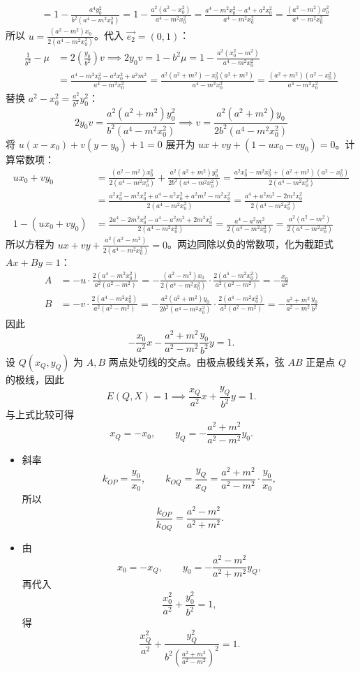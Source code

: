 \begin{solution}
\begin{align*}
&=1 - \frac{a^4 y_0^2}{b^2(a^4-m^2 x_0^2)} = 1 - \frac{a^2(a^2-x_0^2)}{a^4-m^2 x_0^2} = \frac{a^4-m^2 x_0^2 - a^4 + a^2 x_0^2}{a^4-m^2 x_0^2} = \frac{(a^2-m^2)x_0^2}{a^4-m^2 x_0^2}
\end{align*}
所以 $u = \frac{(a^2-m^2)x_0}{2(a^4-m^2 x_0^2)}$。代入 $\vec{e_2} = (0,1)$：
\begin{align*}
\frac{1}{b^2} - \mu &= 2\left(\frac{y_0}{b^2}\right)v \implies 2y_0 v = 1 - b^2 \mu = 1 - \frac{a^2(x_0^2-m^2)}{a^4-m^2 x_0^2}\\
&= \frac{a^4-m^2 x_0^2 - a^2 x_0^2 + a^2 m^2}{a^4-m^2 x_0^2} = \frac{a^2(a^2+m^2) - x_0^2(a^2+m^2)}{a^4-m^2 x_0^2} = \frac{(a^2+m^2)(a^2-x_0^2)}{a^4-m^2 x_0^2}
\end{align*}
替换 $a^2-x_0^2 = \frac{a^2}{b^2}y_0^2$：$$2y_0 v = \frac{a^2(a^2+m^2)y_0^2}{b^2(a^4-m^2 x_0^2)} \implies v = \frac{a^2(a^2+m^2)y_0}{2b^2(a^4-m^2 x_0^2)}$$
将 $u(x-x_0) + v(y-y_0) + 1 = 0$ 展开为 $ux + vy + (1 - ux_0 - vy_0) = 0$。计算常数项：
\begin{align*}
u x_0 + v y_0 &= \frac{(a^2-m^2)x_0^2}{2(a^4-m^2 x_0^2)} + \frac{a^2(a^2+m^2)y_0^2}{2b^2(a^4-m^2 x_0^2)} = \frac{a^2 x_0^2 - m^2 x_0^2 + (a^2+m^2)(a^2-x_0^2)}{2(a^4-m^2 x_0^2)}\\
&= \frac{a^2 x_0^2 - m^2 x_0^2 + a^4 - a^2 x_0^2 + a^2 m^2 - m^2 x_0^2}{2(a^4-m^2 x_0^2)} = \frac{a^4 + a^2 m^2 - 2m^2 x_0^2}{2(a^4-m^2 x_0^2)}\\
1 - (u x_0 + v y_0) &= \frac{2a^4 - 2m^2 x_0^2 - a^4 - a^2 m^2 + 2m^2 x_0^2}{2(a^4-m^2 x_0^2)} = \frac{a^4 - a^2 m^2}{2(a^4-m^2 x_0^2)} = \frac{a^2(a^2-m^2)}{2(a^4-m^2 x_0^2)}
\end{align*}
所以方程为 $ux + vy + \frac{a^2(a^2-m^2)}{2(a^4-m^2 x_0^2)} = 0$。两边同除以负的常数项，化为截距式 $Ax + By = 1$：
\begin{align*}
A &= -u \cdot \frac{2(a^4-m^2 x_0^2)}{a^2(a^2-m^2)} = -\frac{(a^2-m^2)x_0}{2(a^4-m^2 x_0^2)} \cdot \frac{2(a^4-m^2 x_0^2)}{a^2(a^2-m^2)} = -\frac{x_0}{a^2}\\
B &= -v \cdot \frac{2(a^4-m^2 x_0^2)}{a^2(a^2-m^2)} = -\frac{a^2(a^2+m^2)y_0}{2b^2(a^4-m^2 x_0^2)} \cdot \frac{2(a^4-m^2 x_0^2)}{a^2(a^2-m^2)} = -\frac{a^2+m^2}{a^2-m^2} \frac{y_0}{b^2}
\end{align*}
因此
$$-\frac{x_0}{a^2}x - \frac{a^2+m^2}{a^2-m^2}\frac{y_0}{b^2}y = 1.$$
设 $Q(x_Q, y_Q)$ 为 $A,B$ 两点处切线的交点。由极点极线关系，弦 $AB$ 正是点 $Q$ 的极线，因此
$$E(Q, X) = 1 \implies \frac{x_Q}{a^2}x + \frac{y_Q}{b^2}y = 1.$$
与上式比较可得
$$x_Q = -x_0,\qquad y_Q = -\frac{a^2+m^2}{a^2-m^2}y_0.$$
\begin{itemize}
\item 斜率
$$k_{OP} = \frac{y_0}{x_0},\qquad k_{OQ} = \frac{y_Q}{x_Q} = \frac{a^2+m^2}{a^2-m^2}\cdot \frac{y_0}{x_0},$$
所以
$$\frac{k_{OP}}{k_{OQ}} = \frac{a^2-m^2}{a^2+m^2}.$$
\item 由
$$x_0 = -x_Q,\qquad y_0 = -\frac{a^2-m^2}{a^2+m^2} y_Q,$$
再代入
$$\frac{x_0^2}{a^2} + \frac{y_0^2}{b^2} = 1,$$
得
$$\frac{x_Q^2}{a^2} + \frac{y_Q^2}{b^2 \left( \frac{a^2+m^2}{a^2-m^2} \right)^2} = 1.$$
\end{itemize}
\end{solution}

